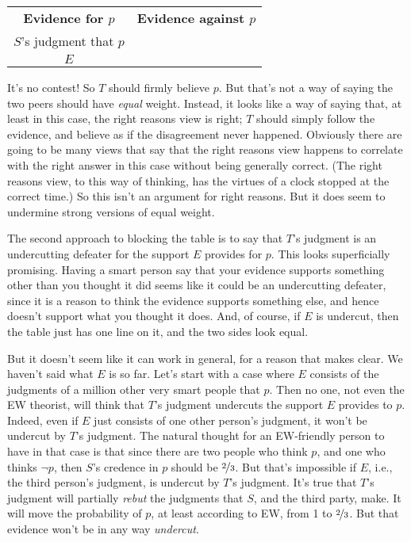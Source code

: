 \begin{center}
\begin{tabular}{c c}
\textbf{Evidence for $p$} & \textbf{Evidence against $p$} \\
$S$'s judgment that $p$ & \\
$E$ & \\
\end{tabular}
\end{center}

\noindent It's no contest! So $T$ should firmly believe $p$. But that's not a way of saying the two peers should have \textit{equal} weight. Instead, it looks like a way of saying that, at least in this case, the right reasons view is right; $T$ should simply follow the evidence, and believe as if the disagreement never happened. Obviously there are going to be many views that say that the right reasons view happens to correlate with the right answer in this case without being generally correct. (The right reasons view, to this way of thinking, has the virtues of a clock stopped at the correct time.) So this isn't an argument for right reasons. But it does seem to undermine strong versions of equal weight.

The second approach to blocking the table is to say that $T$'s judgment is an undercutting defeater for the support $E$ provides for $p$. This looks superficially promising. Having a smart person say that your evidence supports something other than you thought it did seems like it could be an undercutting defeater, since it is a reason to think the evidence supports something else, and hence doesn't support what you thought it does. And, of course, if $E$ is undercut, then the table just has one line on it, and the two sides look equal.

But it doesn't seem like it can work in general, for a reason that \citet{Kelly2010-KELPDA} makes clear. We haven't said what $E$ is so far. Let's start with a case where $E$ consists of the judgments of a million other very smart people that $p$. Then no one, not even the EW theorist, will think that $T$'s judgment undercuts the support $E$ provides to $p$. Indeed, even if $E$ just consists of one other person's judgment, it won't be undercut by $T$'s judgment. The natural thought for an EW-friendly person to have in that case is that since there are two people who think $p$, and one who thinks $\neg p$, then $S$'s credence in $p$ should be $\nicefrac{2}{3}$. But that's impossible if $E$, i.e., the third person's judgment, is undercut by $T$'s judgment. It's true that $T$'s judgment will partially \textit{rebut} the judgments that $S$, and the third party, make. It will move the probability of $p$, at least according to EW, from 1 to $\nicefrac{2}{3}$. But that evidence won't be in any way \textit{undercut}.

